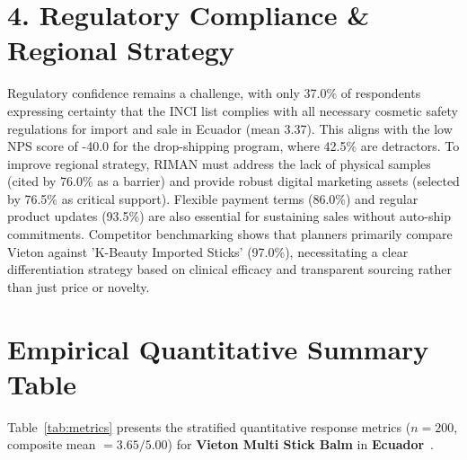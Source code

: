 \documentclass[10pt,twocolumn,a4paper]{article}
\begin{document}
\section{4. Regulatory Compliance \& Regional Strategy}
Regulatory confidence remains a challenge, with only 37.0\% of respondents expressing certainty that the INCI list complies with all necessary cosmetic safety regulations for import and sale in Ecuador (mean 3.37). This aligns with the low NPS score of -40.0 for the drop-shipping program, where 42.5\% are detractors. To improve regional strategy, RIMAN must address the lack of physical samples (cited by 76.0\% as a barrier) and provide robust digital marketing assets (selected by 76.5\% as critical support). Flexible payment terms (86.0\%) and regular product updates (93.5\%) are also essential for sustaining sales without auto-ship commitments. Competitor benchmarking shows that planners primarily compare Vieton against 'K-Beauty Imported Sticks' (97.0\%), necessitating a clear differentiation strategy based on clinical efficacy and transparent sourcing rather than just price or novelty.


\section{Empirical Quantitative Summary Table}
Table~\ref{tab:metrics} presents the stratified quantitative response metrics ($n = 200$, composite mean $= 3.65/5.00$) for \textbf{Vieton Multi Stick Balm} in \textbf{Ecuador}~\cite{ref_kaggle_doi,ref_hf_doi}.
\end{document}
